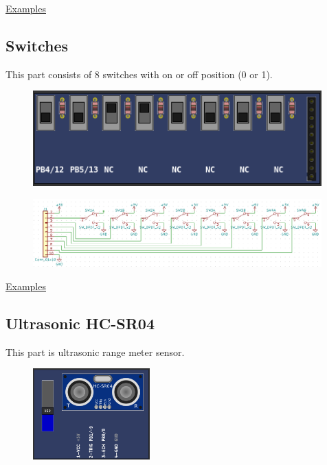 \href{https://lcgamboa.github.io/picsimlab_examples/Parts.html\#SHT3X_(Temp._Hum.)}{Examples}



\subsection{Switches}
This part consists of 8 switches with on or off position (0 or 1).

\begin{figure}[H]
\center
\includegraphics[width=0.99\textwidth]{img/part_switches.png} 
\end{figure} 

\begin{figure}[H]
\center
\includegraphics[width=0.99\textwidth]{img/part_switches_.png} 
\end{figure} 

\href{https://lcgamboa.github.io/picsimlab_examples/Parts.html\#Switches}{Examples}



\subsection{Ultrasonic HC-SR04}
This part is ultrasonic range meter sensor.

\begin{figure}[H]
\center
\includegraphics[width=0.4\textwidth]{img/part_hcsr04.png} 
\end{figure} 



